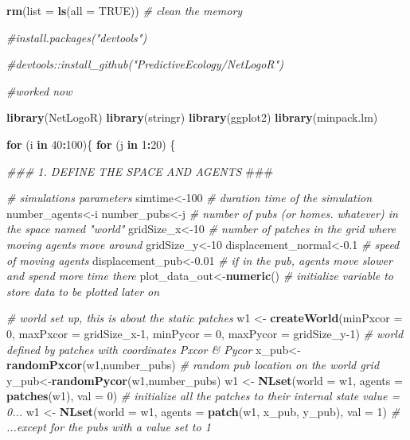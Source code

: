 \documentclass[
]{article}
\newenvironment{Shaded}{\begin{snugshade}}{\end{snugshade}}
\newcommand{\AlertTok}[1]{\textcolor[rgb]{0.94,0.16,0.16}{#1}}
\newcommand{\CommentTok}[1]{\textcolor[rgb]{0.56,0.35,0.01}{\textit{#1}}}
\newcommand{\ControlFlowTok}[1]{\textcolor[rgb]{0.13,0.29,0.53}{\textbf{#1}}}
\newcommand{\DataTypeTok}[1]{\textcolor[rgb]{0.13,0.29,0.53}{#1}}
\newcommand{\DecValTok}[1]{\textcolor[rgb]{0.00,0.00,0.81}{#1}}
\newcommand{\FloatTok}[1]{\textcolor[rgb]{0.00,0.00,0.81}{#1}}
\newcommand{\KeywordTok}[1]{\textcolor[rgb]{0.13,0.29,0.53}{\textbf{#1}}}
\newcommand{\NormalTok}[1]{#1}
\newcommand{\OperatorTok}[1]{\textcolor[rgb]{0.81,0.36,0.00}{\textbf{#1}}}
\newcommand{\OtherTok}[1]{\textcolor[rgb]{0.56,0.35,0.01}{#1}}
\newcommand{\StringTok}[1]{\textcolor[rgb]{0.31,0.60,0.02}{#1}}
\begin{document}
\begin{Shaded}
\begin{Highlighting}[]
\KeywordTok{rm}\NormalTok{(}\DataTypeTok{list =} \KeywordTok{ls}\NormalTok{(}\DataTypeTok{all =} \OtherTok{TRUE}\NormalTok{)) }\CommentTok{# clean the memory}


\CommentTok{#install.packages("devtools")}

\CommentTok{#devtools::install_github("PredictiveEcology/NetLogoR")}

\CommentTok{#worked now}




\KeywordTok{library}\NormalTok{(NetLogoR)}
\KeywordTok{library}\NormalTok{(stringr)}
\KeywordTok{library}\NormalTok{(ggplot2)}
\KeywordTok{library}\NormalTok{(minpack.lm)}


\ControlFlowTok{for}\NormalTok{ (i }\ControlFlowTok{in} \DecValTok{40}\OperatorTok{:}\DecValTok{100}\NormalTok{)\{}
  \ControlFlowTok{for}\NormalTok{ (j }\ControlFlowTok{in} \DecValTok{1}\OperatorTok{:}\DecValTok{20}\NormalTok{) \{}
    
    
    \CommentTok{### 1. DEFINE THE SPACE AND AGENTS }\AlertTok{###}
    
    \CommentTok{# simulations parameters}
\NormalTok{    simtime<-}\DecValTok{100} \CommentTok{# duration time of the simulation}
\NormalTok{    number_agents<-i}
\NormalTok{    number_pubs<-j }\CommentTok{# number of pubs (or homes. whatever) in the space named "world"}
\NormalTok{    gridSize_x<-}\DecValTok{10} \CommentTok{# number of patches in the grid where moving agents move around}
\NormalTok{    gridSize_y<-}\DecValTok{10}
\NormalTok{    displacement_normal<-}\FloatTok{0.1} \CommentTok{# speed of moving agents }
\NormalTok{    displacement_pub<-}\FloatTok{0.01} \CommentTok{# if in the pub, agents move slower and spend more time there}
\NormalTok{    plot_data_out<-}\KeywordTok{numeric}\NormalTok{() }\CommentTok{# initialize variable to store data to be plotted later on}
    
    \CommentTok{# world set up, this is about the static patches}
\NormalTok{    w1 <-}\StringTok{ }\KeywordTok{createWorld}\NormalTok{(}\DataTypeTok{minPxcor =} \DecValTok{0}\NormalTok{, }\DataTypeTok{maxPxcor =}\NormalTok{ gridSize_x}\DecValTok{-1}\NormalTok{, }\DataTypeTok{minPycor =} \DecValTok{0}\NormalTok{, }\DataTypeTok{maxPycor =}\NormalTok{ gridSize_y}\DecValTok{-1}\NormalTok{) }\CommentTok{# world defined by patches with coordinates Pxcor & Pycor}
\NormalTok{    x_pub<-}\KeywordTok{randomPxcor}\NormalTok{(w1,number_pubs) }\CommentTok{# random pub location on the world grid}
\NormalTok{    y_pub<-}\KeywordTok{randomPycor}\NormalTok{(w1,number_pubs)}
\NormalTok{    w1 <-}\StringTok{ }\KeywordTok{NLset}\NormalTok{(}\DataTypeTok{world =}\NormalTok{ w1, }\DataTypeTok{agents =} \KeywordTok{patches}\NormalTok{(w1), }\DataTypeTok{val =} \DecValTok{0}\NormalTok{) }\CommentTok{# initialize all the patches to their internal state value = 0...}
\NormalTok{    w1 <-}\StringTok{ }\KeywordTok{NLset}\NormalTok{(}\DataTypeTok{world =}\NormalTok{ w1, }\DataTypeTok{agents =} \KeywordTok{patch}\NormalTok{(w1, x_pub, y_pub), }\DataTypeTok{val =} \DecValTok{1}\NormalTok{) }\CommentTok{# ...except for the pubs with a value set to 1}
    

\end{Highlighting}
\end{Shaded}
\end{document}
